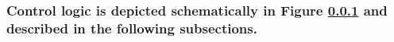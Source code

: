 \documentclass[10pt]{article}
\begin{document}
\subsubsection{Control logic is depicted schematically in Figure \ref{figure:control_logic} and described in the following subsections.} \label{figure:control_logic}

\begin{figure}[h]
  \centering
  
\end{figure}

\ifdefined\BuildingsTemplatesAirHandlersFansInterfacesPartialAirHandlertypFanRet
\fi
\end{document}
